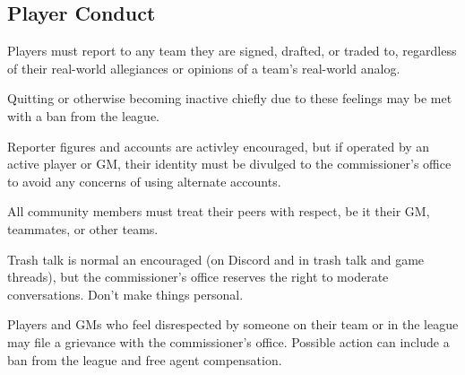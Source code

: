 \subsection{Player Conduct}
\begin{deepEnumerate}
    \item Players must report to any team they are signed, drafted, or traded to,
          regardless of their real-world allegiances or opinions of a team's real-world analog.
          \begin{deepEnumerate}
              \item Quitting or otherwise becoming inactive 
                    chiefly due to these feelings
                    may be met with a ban from the league.
          \end{deepEnumerate}
    \item Reporter figures and accounts are activley encouraged,
          but if operated by an active player or GM,
          their identity must be divulged to the commissioner’s office
          to avoid any concerns of using alternate accounts.
    \item All community members must treat their peers with respect,
          be it their GM, teammates, or other teams.
          \begin{deepEnumerate}
              \item Trash talk is normal an encouraged
                    (on Discord and in trash talk and game threads),
                    but the commissioner’s office reserves the right to moderate conversations.
                    Don't make things personal.
              \item Players and GMs who feel disrespected by someone on their team or in the league 
                    may file a grievance with the commissioner’s office.
                    Possible action can include a ban from the league and free agent compensation.
          \end{deepEnumerate}
\end{deepEnumerate}
